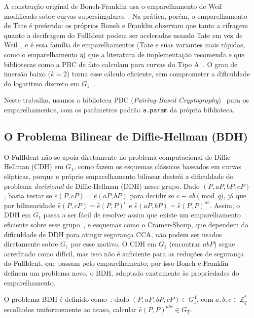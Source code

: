 A construção original de Boneh-Franklin usa o emparelhamento de Weil modificado sobre curvas
supersingulares~\cite{boneh2001ibe}. Na prática, porém, o emparelhamento de Tate é preferido:
os próprios Boneh e Franklin observam que tanto a cifragem quanto a decifragem do FullIdent
podem ser aceleradas usando Tate em vez de Weil~\cite{boneh2001ibe}, e é essa família de
emparelhamentos (Tate e suas variantes mais rápidas, como o emparelhamento $\eta$) que a
literatura de implementação recomenda e que bibliotecas como a PBC de fato calculam para
curvas do Tipo A~\cite{menezes2009intro}. O grau de imersão baixo ($k=2$) torna esse cálculo
eficiente, sem comprometer a dificuldade do logaritmo discreto em $G_1$~\cite{menezes2009intro}.

Neste trabalho, usamos a biblioteca PBC (\textit{Pairing-Based Cryptography})~\cite{pbc} para
os emparelhamentos, com os parâmetros padrão \texttt{a.param} da própria biblioteca.

\subsection{O Problema Bilinear de Diffie-Hellman (BDH)}

O FullIdent não se apoia diretamente no problema computacional de Diffie-Hellman (CDH) em
$G_1$, como fazem os esquemas clássicos baseados em curvas elípticas, porque o próprio
emparelhamento bilinear destrói a dificuldade do problema \emph{decisional} de Diffie-Hellman
(DDH) nesse grupo. Dado $(P, aP, bP, cP)$, basta testar se $\hat{e}(P, cP) = \hat{e}(aP, bP)$
para decidir se $c \equiv ab \pmod q$, já que por bilinearidade $\hat{e}(P, cP) =
\hat{e}(P,P)^c$ e $\hat{e}(aP, bP) = \hat{e}(P,P)^{ab}$. Assim, o DDH em $G_1$ passa a ser
fácil de resolver assim que existe um emparelhamento eficiente sobre esse
grupo~\cite{boneh2001ibe,menezes2009intro}, e esquemas como o Cramer-Shoup, que dependem da
dificuldade de DDH para atingir segurança CCA, não podem ser usados diretamente sobre $G_1$
por esse motivo. O CDH em $G_1$ (encontrar $abP$) segue acreditado como difícil, mas isso não é
suficiente para as reduções de segurança do FullIdent, que passam pelo emparelhamento;
por isso Boneh e Franklin definem um problema novo, o BDH, adaptado exatamente às
propriedades do emparelhamento.

O problema BDH é definido como~\cite{boneh2001ibe}: dado $(P, aP, bP, cP) \in G_1^4$, com
$a, b, c \in \mathbb{Z}_q^*$ escolhidos uniformemente ao acaso, calcular $\hat{e}(P, P)^{abc}
\in G_T$.

